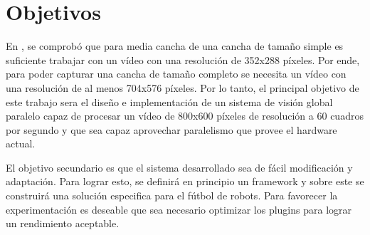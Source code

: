 
\section{Objetivos}

En \cite{torres2014}, se comprobó que para media cancha de una cancha de tamaño
simple es suficiente trabajar con un vídeo con una resolución de 352x288
píxeles. Por ende, para poder capturar una cancha de tamaño completo se necesita
un vídeo con una resolución de al menos 704x576 píxeles. Por lo tanto, el
principal objetivo de este trabajo sera el diseño e implementación de un sistema
de visión global paralelo capaz de procesar un vídeo de 800x600 píxeles de
resolución a 60 cuadros por segundo y que sea capaz aprovechar paralelismo que
provee el hardware actual.

El objetivo secundario es que el sistema desarrollado sea de fácil modificación
y adaptación. Para lograr esto, se definirá en principio un framework y sobre
este se construirá una solución especifica para el fútbol de robots. Para
favorecer la experimentación es deseable que sea necesario optimizar los plugins
para lograr un rendimiento aceptable.
